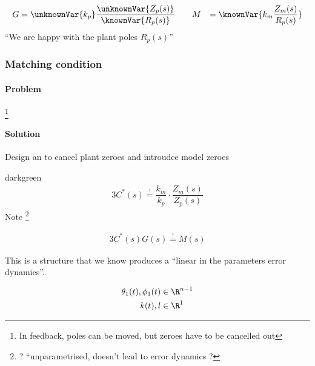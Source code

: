 \begin{alignat*}{3}
G = \unknownVar{k_p} \dfrac{\unknownVar{Z_p(s)}}{\knownVar{R_p(s)}}
\qquad & M &= \knownVar{k_m \dfrac{Z_m(s)}{R_p(s)}}
\end{alignat*}
``We are happy with the plant poles $R_p(s)$''

\subsubsection*{Matching condition}
\paragraph{Problem}
%
    \footnote{In feedback, poles can be moved, but 
    zeroes have to be cancelled out}

\paragraph{Solution}
Design an 
to cancel plant zeroes and introudce model zeroes

\begin{conclusion}{darkgreen}
\begin{alignat*}{3}
C^*(s) \overset{!}{=} \dfrac{k_m}{k_p} \cdot \dfrac{Z_m(s)}{Z_p(s)}
\end{alignat*}
Note%
\footnote{? ``unparametrised, doesn't lead to error dynamics ?}
\end{conclusion}

\begin{figure}[H]
    \centering
    
\end{figure}

\begin{alignat*}{3}
C^*(s) G(s) \overset{!}{=} M(s)
\end{alignat*}

This is a structure that we know produces a ``linear in the
parameters error dynamics''.

\begin{figure}[H]
    \centering
    
\end{figure}

\begin{alignat*}{3}
\theta_1(t), \phi_1(t) &\in \R^{n-1}\\
k(t), l &\in \R^1
\end{alignat*}

